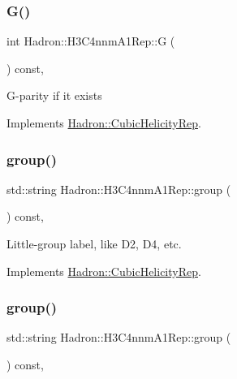 \subsubsection{\texorpdfstring{G()}{G()}\hspace{0.1cm}{\footnotesize\ttfamily [3/3]}}
{\footnotesize\ttfamily int Hadron\+::\+H3\+C4nnm\+A1\+Rep\+::G (\begin{DoxyParamCaption}{ }\end{DoxyParamCaption}) const\hspace{0.3cm}{\ttfamily [inline]}, {\ttfamily [virtual]}}

G-\/parity if it exists 

Implements \mbox{\hyperlink{structHadron_1_1CubicHelicityRep_a50689f42be1e6170aa8cf6ad0597018b}{Hadron\+::\+Cubic\+Helicity\+Rep}}.

\mbox{\label{structHadron_1_1H3C4nnmA1Rep_a90bcfd4f15d29f444a79b1dcd8198ea5}} 
\subsubsection{\texorpdfstring{group()}{group()}\hspace{0.1cm}{\footnotesize\ttfamily [1/5]}}
{\footnotesize\ttfamily std\+::string Hadron\+::\+H3\+C4nnm\+A1\+Rep\+::group (\begin{DoxyParamCaption}{ }\end{DoxyParamCaption}) const\hspace{0.3cm}{\ttfamily [inline]}, {\ttfamily [virtual]}}

Little-\/group label, like D2, D4, etc. 

Implements \mbox{\hyperlink{structHadron_1_1CubicHelicityRep_a101a7d76cd8ccdad0f272db44b766113}{Hadron\+::\+Cubic\+Helicity\+Rep}}.

\mbox{\label{structHadron_1_1H3C4nnmA1Rep_a90bcfd4f15d29f444a79b1dcd8198ea5}} 
\subsubsection{\texorpdfstring{group()}{group()}\hspace{0.1cm}{\footnotesize\ttfamily [2/5]}}
{\footnotesize\ttfamily std\+::string Hadron\+::\+H3\+C4nnm\+A1\+Rep\+::group (\begin{DoxyParamCaption}{ }\end{DoxyParamCaption}) const\hspace{0.3cm}{\ttfamily [inline]}, {\ttfamily [virtual]}}

